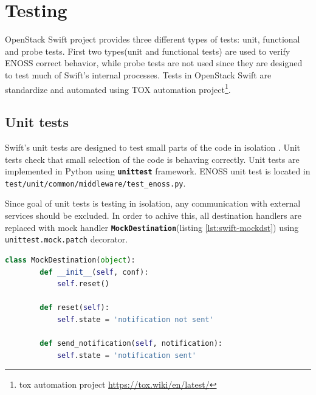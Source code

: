 \section{Testing}
    OpenStack Swift project provides three different types of tests: unit, functional and probe tests. First two types(unit and functional tests) are used to verify ENOSS correct behavior, while probe tests are not used since they are designed to test much of Swift's internal processes.
    Tests in OpenStack Swift are standardize and automated using TOX automation project\footnote{tox automation project {\url{https://tox.wiki/en/latest/}}}.

    \subsection{Unit tests}
    Swift's unit tests are designed to test small parts of the code in isolation \cite{swiftContributing123}. Unit tests check that small selection of the code is behaving correctly. Unit tests are implemented in Python using \textbf{\texttt{unittest}} framework. ENOSS unit test is located in \texttt{test/unit/common/middleware/test\_enoss.py}.

    Since goal of unit tests is testing in isolation, any communication with external services should be excluded. In order to achive this, all destination handlers are replaced with mock handler \textbf{\texttt{MockDestination}}(listing \ref{lst:swift-mockdst}) using \texttt{unittest.mock.patch} decorator.

    \begin{lstlisting}[language=Python, style=pythonStyle, caption=Mock class used to replace destination handlers in unit tests, label=lst:swift-mockdst]
    class MockDestination(object):
        def __init__(self, conf):
            self.reset()

        def reset(self):
            self.state = 'notification not sent'

        def send_notification(self, notification):
            self.state = 'notification sent'
    \end{lstlisting}

